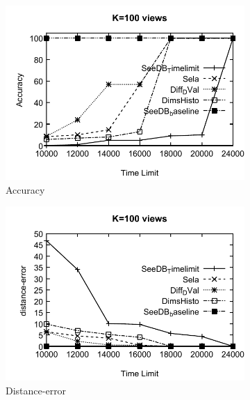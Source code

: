 \begin{figure}
  \begin{subfigure}[b]{0.32\textwidth}
    \includegraphics[width=\textwidth]{tl1.pdf}
    \caption{Accuracy}
        \label{fig:tlfig1}%
  \end{subfigure}
	\begin{subfigure}[b]{0.32\textwidth}
    \includegraphics[width=\textwidth]{tl11.pdf}
    \caption{Distance-error}
        \label{fig:tlfig11}%
  \end{subfigure}
  \begin{subfigure}[b]{0.32\textwidth}

\end{subfigure}
\end{figure}
